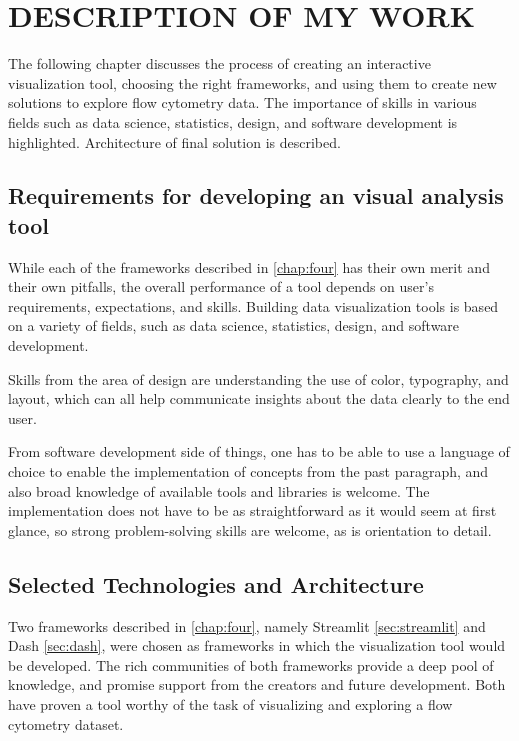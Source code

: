 \chapter{DESCRIPTION OF MY WORK}
\label{chap:five}
The following chapter discusses the process of creating an interactive visualization tool, choosing the right frameworks, and using them to create new solutions to explore flow cytometry data. The importance of skills in various fields such as data science, statistics, design, and software development is highlighted. Architecture of final solution is described.

\section{Requirements for developing an visual analysis tool}
\label{sec:req}
While each of the frameworks described in \ref{chap:four} has their own merit and their own pitfalls, the overall performance of a tool depends on user's requirements, expectations, and skills. Building data visualization tools is based on a variety of fields, such as data science, statistics, design, and software development. 

Skills from the area of design are understanding the use of color, typography, and layout, which can all help communicate insights about the data clearly to the end user. 

From software development side of things, one has to be able to use a language of choice to enable the implementation of concepts from the past paragraph, and also broad knowledge of available tools and libraries is welcome. The implementation does not have to be as straightforward as it would seem at first glance, so strong problem-solving skills are welcome, as is orientation to detail. 

\section{Selected Technologies and Architecture}
\label{sec:selected_technologies}
Two frameworks described in \ref{chap:four}, namely Streamlit \ref{sec:streamlit} and Dash \ref{sec:dash}, were chosen as frameworks in which the visualization tool would be developed. The rich communities of both frameworks provide a deep pool of knowledge, and promise support from the creators and future development. Both have proven a tool worthy of the task of visualizing and exploring a flow cytometry dataset. 

